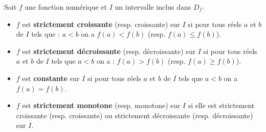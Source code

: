 \documentclass[10pt, a4paper]{article}
\begin{document}
\begin{Definition}[]
Soit $f$ une fonction numérique et $I$ un intervalle inclus dans $D_f$.
\begin{itemize}[leftmargin=*,itemsep=0.5pt]
    \item $f$ est \textbf{strictement croissante} (resp. croissante) sur $I$ si pour tous réels $a$ et $b$ de $I$ tels que : $a < b$ on a $f(a) < f(b)$ (resp. $f(a) \leq f(b)$).
    \item $f$ est \textbf{strictement décroissante} (resp. décroissante) sur $I$ si pour tous réels $a$ et $b$ de $I$ tels que $a < b$ on a : $f(a) > f(b)$ (resp. $f(a) \geq f(b)$).
    \item $f$ est \textbf{constante} sur $I$ si pour tous réels $a$ et $b$ de $I$ tels que $a < b$ on a $f(a) = f(b)$.
    \item $f$ est \textbf{strictement monotone} (resp. monotone) sur $I$ si elle est strictement croissante (resp. croissante) ou strictement décroissante (resp. décroissante) sur $I$.
\end{itemize}
\end{Definition}
\end{document}
